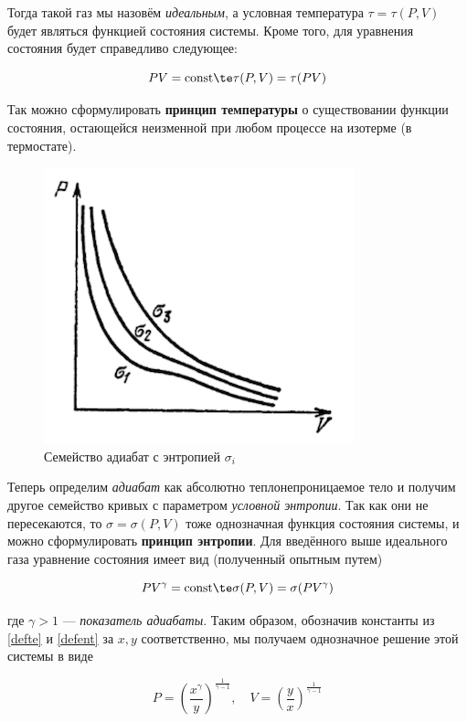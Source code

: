 \documentclass[12pt]{kiarticle}
\newcommand{\co}{\ensuremath{\mathrm{const}}}
\begin{document}
Тогда такой газ мы назовём \textit{идеальным}, а условная температура $ \tau = \tau (P, V) $ будет являться функцией состояния системы. Кроме того, для уравнения состояния будет справедливо следующее:

\begin{equation}\label{defte}
PV = \co \te \tau (P, V) = \tau (PV)
\end{equation}

Так можно сформулировать \textbf{принцип температуры} о существовании функции состояния, остающейся неизменной при любом процессе на изотерме (в термостате).

\begin{figure} 
	\includegraphics{entdef}
	\caption{Семейство адиабат с энтропией $ \sigma_i $}
\end{figure}

Теперь определим \textit{адиабат} как абсолютно теплонепроницаемое тело и получим другое семейство кривых с параметром \textit{условной энтропии}. Так как они не пересекаются, то $ \sigma = \sigma (P, V) $ тоже однозначная функция состояния системы, и можно сформулировать \textbf{принцип энтропии}. Для введённого выше идеального газа  уравнение состояния имеет вид (полученный опытным путем)

\begin{equation}\label{defent}
PV^\gamma = \co \te \sigma (P, V) = \sigma (PV^\gamma)
\end{equation}

где $ \gamma > 1 $ --- \textit{показатель адиабаты}. Таким образом, обозначив константы из \eqref{defte} и \eqref{defent} за $ x, y $ соответственно, мы получаем однозначное решение этой системы в виде

\begin{equation}\label{xy}
P = \left( \dfrac{x^\gamma}{y} \right)^\frac{1}{\gamma -1}, \quad V = \left (\dfrac{y}{x} \right )^\frac{1}{\gamma -1} 
\end{equation}
\end{document}
